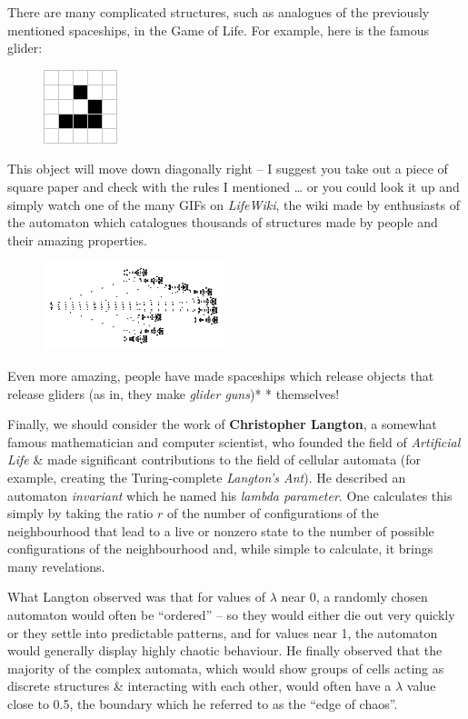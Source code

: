 There are many complicated structures, such as analogues of the
previously mentioned spaceships, in the Game of Life. For example, here
is the famous glider:

\begin{figure}[htbp]
\centering
\includegraphics{image_4.png}
\caption{}
\end{figure}

This object will move down diagonally right -- I suggest you take out a
piece of square paper and check with the rules I mentioned \ldots{} or
you could look it up and simply watch one of the many GIFs on
\emph{LifeWiki}, the wiki made by enthusiasts of the automaton which
catalogues thousands of structures made by people and their amazing
properties.

\begin{figure}[htbp]
\centering
\includegraphics{image_5.png}
\caption{}
\end{figure}

Even more amazing, people have made spaceships which release objects
that release gliders (as in, they make \emph{glider guns})* *
themselves!

Finally, we should consider the work of \textbf{Christopher Langton}, a
somewhat famous mathematician and computer scientist, who founded the
field of \emph{Artificial Life} \& made significant contributions to the
field of cellular automata (for example, creating the Turing-complete
\emph{Langton's Ant}). He described an automaton \emph{invariant} which
he named his \emph{lambda parameter}. One calculates this simply by
taking the ratio \(r\) of the number of configurations of the
neighbourhood that lead to a live or nonzero state to the number of
possible configurations of the neighbourhood and, while simple to
calculate, it brings many revelations.

What Langton observed was that for values of \(λ\) near 0, a randomly
chosen automaton would often be ``ordered'' -- so they would either die
out very quickly or they settle into predictable patterns, and for
values near 1, the automaton would generally display highly chaotic
behaviour. He finally observed that the majority of the complex
automata, which would show groups of cells acting as discrete structures
\& interacting with each other, would often have a \(λ\) value close to
0.5, the boundary which he referred to as the ``edge of chaos''.


